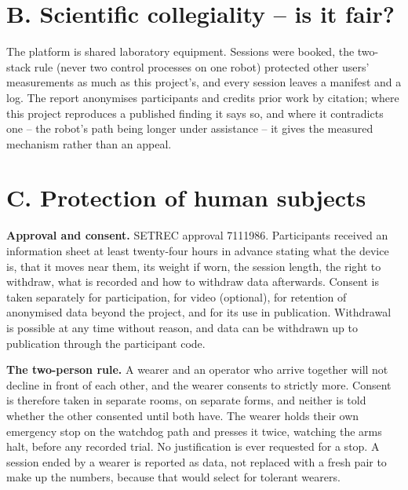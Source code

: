 \section{B. Scientific collegiality -- is it fair?}

The platform is shared laboratory equipment. Sessions were booked, the
two-stack rule (never two control processes on one robot) protected other
users' measurements as much as this project's, and every session leaves a
manifest and a log. The report anonymises participants and credits prior
work by citation; where this project reproduces a published finding it
says so, and where it contradicts one -- the robot's path being longer
under assistance -- it gives the measured mechanism rather than an
appeal.

\section{C. Protection of human subjects}

\textbf{Approval and consent.} SETREC approval 7111986. Participants
received an information sheet at least twenty-four hours in advance
stating what the device is, that it moves near them, its weight if worn,
the session length, the right to withdraw, what is recorded and how to
withdraw data afterwards. Consent is taken separately for participation,
for video (optional), for retention of anonymised data beyond the project,
and for its use in publication. Withdrawal is possible at any time without
reason, and data can be withdrawn up to publication through the
participant code.

\textbf{The two-person rule.} A wearer and an operator who arrive together
will not decline in front of each other, and the wearer consents to strictly
more. Consent is therefore taken in separate rooms, on separate forms, and
neither is told whether the other consented until both have. The wearer
holds their own emergency stop on the watchdog path and presses it twice,
watching the arms halt, before any recorded trial. No justification is ever
requested for a stop. A session ended by a wearer is reported as data, not
replaced with a fresh pair to make up the numbers, because that would select
for tolerant wearers.

